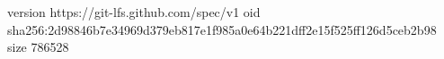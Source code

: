 version https://git-lfs.github.com/spec/v1
oid sha256:2d98846b7e34969d379eb817e1f985a0e64b221dff2e15f525ff126d5ceb2b98
size 786528
